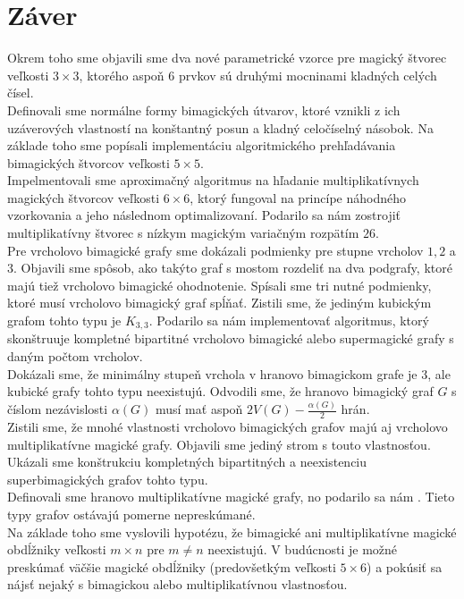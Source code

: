 \chapter*{Záver}  %

Okrem toho sme objavili sme dva nové parametrické vzorce pre magický štvorec veľkosti $3 \times 3$, ktorého aspoň $6$ prvkov sú druhými mocninami kladných celých čísel. \\

Definovali sme normálne formy bimagických útvarov, ktoré vznikli z ich uzáverových vlastností na konštantný posun a kladný celočíselný násobok. Na základe toho sme popísali implementáciu algoritmického prehľadávania bimagických štvorcov veľkosti $5 \times 5$. \\

Impelmentovali sme aproximačný algoritmus na hľadanie multiplikatívnych magických štvorcov veľkosti $6 \times 6$, ktorý fungoval na princípe náhodného vzorkovania a jeho následnom optimalizovaní. Podarilo sa nám zostrojiť multiplikatívny štvorec s nízkym magickým variačným rozpätím $26$. \\

Pre vrcholovo bimagické grafy sme dokázali podmienky pre stupne vrcholov $1, 2$ a $3$. Objavili sme spôsob, ako takýto graf s mostom rozdeliť na dva podgrafy, ktoré majú tiež vrcholovo bimagické ohodnotenie. Spísali sme tri nutné podmienky, ktoré musí vrcholovo bimagický graf spĺňať. Zistili sme, že jediným kubickým grafom tohto typu je $K_{3,3}$. Podarilo sa nám implementovať algoritmus, ktorý skonštruuje kompletné bipartitné vrcholovo bimagické alebo supermagické grafy s daným počtom vrcholov. \\

Dokázali sme, že minimálny stupeň vrchola v hranovo bimagickom grafe je $3$, ale kubické grafy tohto typu neexistujú. Odvodili sme, že hranovo bimagický graf $G$ s číslom nezávislosti $\alpha (G)$ musí mať aspoň $2 V(G) - \frac{\alpha (G)}{2}$ hrán. \\

Zistili sme, že mnohé vlastnosti vrcholovo bimagických grafov majú aj vrcholovo multiplikatívne magické grafy. Objavili sme jediný strom s touto vlastnosťou. Ukázali sme konštrukciu kompletných bipartitných a neexistenciu superbimagických grafov tohto typu. \\

Definovali sme hranovo multiplikatívne magické grafy, no podarilo sa nám . Tieto typy grafov ostávajú pomerne nepreskúmané. \\

Na základe toho sme vyslovili hypotézu, že bimagické ani multiplikatívne magické obdĺžniky veľkosti $m \times n$ pre $m \neq n$ neexistujú. V budúcnosti je možné preskúmať väčšie magické obdĺžniky (predovšetkým veľkosti $5 \times 6$) a pokúsiť sa nájsť nejaký s bimagickou alebo multiplikatívnou vlastnosťou.
